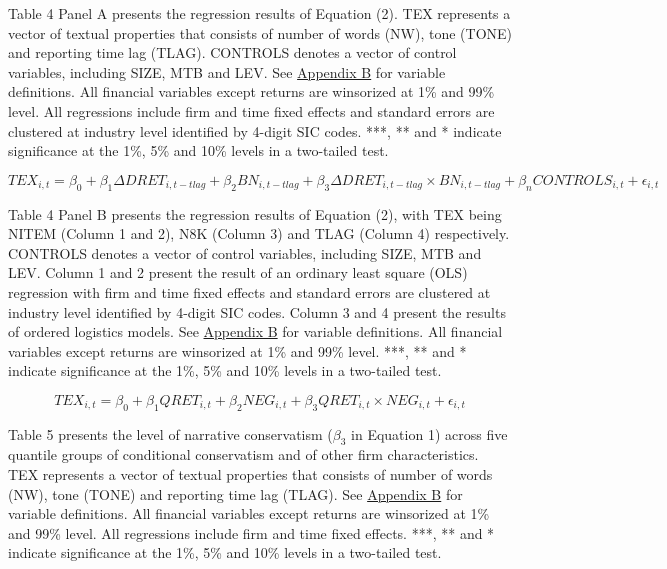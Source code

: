 Table 4 Panel A presents the regression results of Equation (2). 
TEX represents a vector of textual properties that consists of number of words (NW), tone (TONE) and reporting time lag (TLAG). CONTROLS denotes a vector of control variables, including SIZE, MTB and LEV. See \hyperref[appb]{Appendix B} for variable definitions. All financial variables except returns are winsorized at 1\% and 99\% level. All regressions include firm and time fixed effects and standard errors are clustered at industry level identified by 4-digit SIC codes. ***, ** and * indicate significance at the 1\%, 5\% and 10\% levels in a two-tailed test.

\newpage

\setcounter{equation}{1}
\begin{equation}
TEX_{i,t}=\beta_0+\beta_1\Delta DRET_{i,t-tlag}+\beta_2BN_{i,t-tlag}+\beta_3\Delta DRET_{i,t-tlag}\times BN_{i,t-tlag}+\beta_nCONTROLS_{i,t}+\epsilon_{i,t}
\end{equation}
\newline

Table 4 Panel B presents the regression results of Equation (2), with TEX being NITEM (Column 1 and 2), N8K (Column 3) and TLAG (Column 4) respectively. CONTROLS denotes a vector of control variables, including SIZE, MTB and LEV. Column 1 and 2 present the result of an ordinary least square (OLS) regression with firm and time fixed effects and standard errors are clustered at industry level identified by 4-digit SIC codes. Column 3 and 4 present the results of ordered logistics models. See \hyperref[appb]{Appendix B} for variable definitions. All financial variables except returns are winsorized at 1\% and 99\% level. ***, ** and * indicate significance at the 1\%, 5\% and 10\% levels in a two-tailed test.

\newpage

\setcounter{equation}{0}
\begin{equation}
TEX_{i,t}=\beta_0+\beta_1QRET_{i,t}+\beta_2NEG_{i,t}+\beta_3QRET_{i,t}\times NEG_{i,t}+\epsilon_{i,t}
\end{equation}

Table 5 presents the level of narrative conservatism ($\beta_3$ in Equation 1) across five quantile groups of conditional conservatism and of other firm characteristics. TEX represents a vector of textual properties that consists of number of words (NW), tone (TONE) and reporting time lag (TLAG). See \hyperref[appb]{Appendix B} for variable definitions. All financial variables except returns are winsorized at 1\% and 99\% level. All regressions include firm and time fixed effects. ***, ** and * indicate significance at the 1\%, 5\% and 10\% levels in a two-tailed test.

